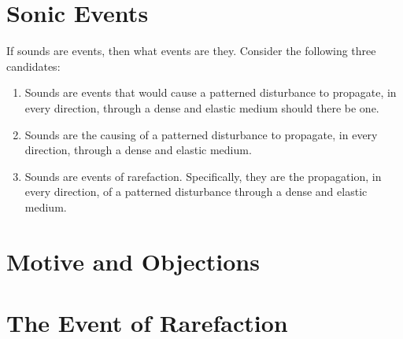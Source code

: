 \documentclass[12pt]{article}
\begin{document}

\section{Sonic Events} %
\label{sec:sonic_events}

If sounds are events, then what events are they. Consider the following three candidates:

\begin{enumerate}
	\item Sounds are events that would cause a patterned disturbance to propagate, in every direction, through a dense and elastic medium should there be one.
	\item Sounds are the causing of a patterned disturbance to propagate, in every direction, through a dense and elastic medium.
	\item Sounds are events of rarefaction. Specifically, they are the propagation, in every direction, of a patterned disturbance through a dense and elastic medium.
\end{enumerate}


\section{Motive and Objections} %
\label{sec:motive_and_objections}




\section{The Event of Rarefaction} %
\label{sec:the_event_of_rarefaction}




 
 
\end{document}
